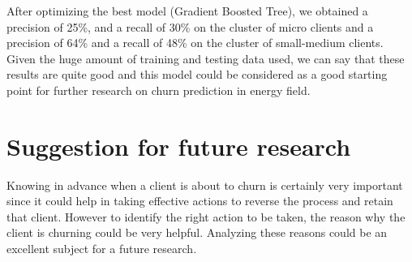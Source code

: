 \documentclass[LaM,binding=0.6cm, english]{sapthesis}
\begin{document}
After optimizing the best model (Gradient Boosted Tree), we obtained a precision of 25\%, and a recall of 30\% on the cluster of micro clients and a precision of 64\% and a recall of 48\% on the cluster of small-medium clients. Given the huge amount of training and testing data used, we can say that these results are quite good and this model could be considered as a good starting point for further research on churn prediction in energy field.

\section{Suggestion for future research}

Knowing in advance when a client is about to churn is certainly very important since it could help in taking effective actions to reverse the process and retain that client. However to identify the right action to be taken, the reason why the client is churning could be very helpful. Analyzing these reasons could be an excellent subject for a future research.

\backmatter
\end{document}
